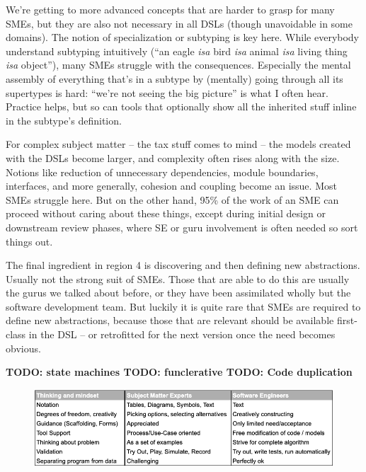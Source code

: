 \documentclass[runningheads]{llncs}
\newcommand\todo[1]{\vspace{1mm}\noindent\textbf{\color{red} {{TODO: {#1}} }}}
\begin{document}
We're getting to more advanced concepts that are harder to grasp for many SMEs,
but they are also not necessary in all DSLs (though unavoidable in some
domains). The notion of specialization or subtyping is key here. While everybody
understand subtyping intuitively (``an eagle \emph{isa} bird \emph{isa} animal
\emph{isa} living thing \emph{isa} object''), many SMEs struggle with the
consequences. Especially the mental assembly of everything that's in a subtype
by (mentally) going through all its supertypes is hard: ``we're not seeing
the big picture'' is what I often hear. Practice helps, but so can tools that
optionally show all the inherited stuff inline in the subtype's definition.

For complex subject matter -- the tax stuff comes to mind -- the models created
with the DSLs become larger, and complexity often rises along with the size.
Notions like reduction of unnecessary dependencies, module boundaries,
interfaces, and more generally, cohesion and coupling become an issue. Most SMEs
struggle here. But on the other hand, 95\% of the work of an SME can proceed
without caring about these things, except during initial design or downstream
review phases, where SE or guru involvement is often needed so sort things out.

The final ingredient in region 4 is discovering and then defining new
abstractions. Usually not the strong suit of SMEs. Those that are able to
do this are usually the gurus we talked about before, or they have been
assimilated wholly but the software development team. But luckily it is
quite rare that SMEs are required to define new abstractions, because those
that are relevant should be available first-class in the DSL -- or retrofitted
for the next version once the need becomes obvious. 
 

\todo{state machines}
\todo{funclerative}
\todo{Code duplication}

\begin{figure}
\begin{center}
    \includegraphics[width=1\columnwidth]{figures/table-prefs.png}
    \caption{}
    \label{table-prefs}
\end{center} 
\end{figure} 
\end{document}
